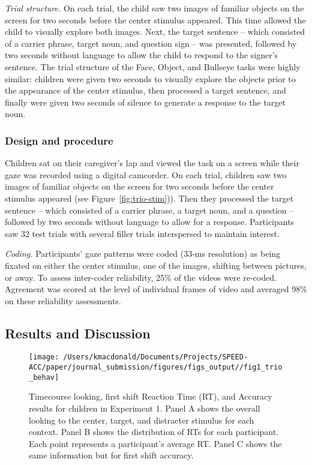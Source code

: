 \documentclass[english,floatsintext,man]{apa6}
\begin{document}
\emph{Trial structure.} On each trial, the child saw two images of
familiar objects on the screen for two seconds before the center
stimulus appeared. This time allowed the child to visually explore both
images. Next, the target sentence -- which consisted of a carrier
phrase, target noun, and question sign -- was presented, followed by two
seconds without language to allow the child to respond to the signer's
sentence. The trial structure of the Face, Object, and Bullseye tasks
were highly similar: children were given two seconds to visually explore
the objects prior to the appearance of the center stimulus, then
processed a target sentence, and finally were given two seconds of
silence to generate a response to the target noun.

\hypertarget{design-and-procedure}{%
\subsubsection{Design and procedure}\label{design-and-procedure}}

Children sat on their caregiver's lap and viewed the task on a screen
while their gaze was recorded using a digital camcorder. On each trial,
children saw two images of familiar objects on the screen for two
seconds before the center stimulus appeared (see
Figure~\ref{fig:trio-stim})). Then they processed the target sentence --
which consisted of a carrier phrase, a target noun, and a question --
followed by two seconds without language to allow for a response.
Participants saw 32 test trials with several filler trials interspersed
to maintain interest.

\emph{Coding.} Participants' gaze patterns were coded (33-ms resolution)
as being fixated on either the center stimulus, one of the images,
shifting between pictures, or away. To assess inter-coder reliability,
25\% of the videos were re-coded. Agreement was scored at the level of
individual frames of video and averaged 98\% on these reliability
assessments.

\hypertarget{results-and-discussion}{%
\subsection{Results and Discussion}\label{results-and-discussion}}

\begin{figure}[!t]

{\centering \texttt{[image: /Users/kmacdonald/Documents/Projects/SPEED-ACC/paper/journal\_submission/figures/figs\_output//fig1\_trio\_behav]} 

}

\caption{Timecourse looking, first shift Reaction Time (RT), and Accuracy results for children in Experiment 1. Panel A shows the overall looking to the center, target, and distracter stimulus for each context. Panel B shows the distribution of RTs for each participant. Each point represents a participant's average RT. Panel C shows the same information but for first shift accuracy.}\label{fig:speed-acc-trio-plot}
\end{figure}
\end{document}

